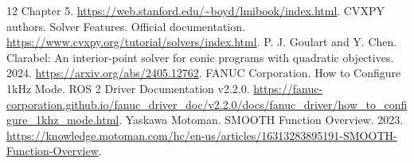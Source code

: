 \documentclass[10pt,letterpaper]{article}
\begin{document}
\begin{thebibliography}{12}
Chapter 5. \url{https://web.stanford.edu/~boyd/lmibook/index.html}.
 CVXPY authors. Solver Features. Official documentation.
\url{https://www.cvxpy.org/tutorial/solvers/index.html}.
 P. J. Goulart and Y. Chen.
Clarabel: An interior-point solver for conic programs with quadratic objectives.
2024. \url{https://arxiv.org/abs/2405.12762}.
 FANUC Corporation.
How to Configure 1kHz Mode. ROS 2 Driver Documentation v2.2.0.
\url{https://fanuc-corporation.github.io/fanuc_driver_doc/v2.2.0/docs/fanuc_driver/how_to_configure_1khz_mode.html}.
 Yaskawa Motoman.
SMOOTH Function Overview. 2023.
\url{https://knowledge.motoman.com/hc/en-us/articles/16313283895191-SMOOTH-Function-Overview}.
\end{thebibliography}
\end{document}
